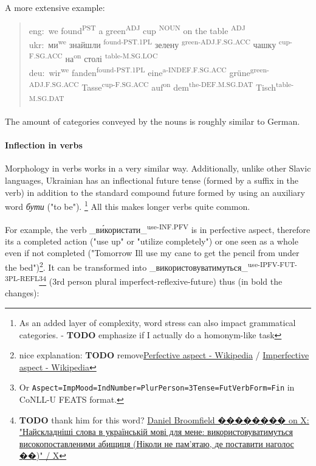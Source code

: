A more extensive example:

\begin{quote}
eng: we found\textsuperscript{PST} a green\textsuperscript{ADJ} cup \textsuperscript{NOUN} on
the table \textsuperscript{ADJ}\\
ukr: ми\textsuperscript{we} знайшли \textsuperscript{found-PST.1PL} зелену
\textsuperscript{green-ADJ.F.SG.ACC} чашку \textsuperscript{cup-F.SG.ACC}
на\textsuperscript{on} столі \textsuperscript{table-M.SG.LOC}\\
deu: wir\textsuperscript{we} fanden\textsuperscript{found-PST.1PL}
eine\textsuperscript{a-INDEF.F.SG.ACC} grüne\textsuperscript{green-ADJ.F.SG.ACC}
Tasse\textsuperscript{cup-F.SG.ACC} auf\textsuperscript{on}
dem\textsuperscript{the-DEF.M.SG.DAT} Tisch\textsuperscript{table-M.SG.DAT}
\end{quote}

The amount of categories conveyed by the nouns is roughly similar to
German.

\paragraph{Inflection in verbs}\label{inflection-in-verbs}

Morphology in verbs works in a very similar way. Additionally, unlike
other Slavic languages, Ukrainian has an inflectional future tense
(formed by a suffix in the verb) in addition to the standard compound
future formed by using an auxiliary word \emph{бути} ("to be").
\footnote{As an added layer of complexity, word stress can also impact
  grammatical categories. - \textbf{TODO} emphasize if I actually do a
  homonym-like task} All this makes longer verbs quite common.

For example, the verb \_ви́користати\_\textsuperscript{use-INF.PFV} is in
perfective aspect, therefore it\textquotesingle s a completed action
("use up" or "utilize completely") or one seen as a whole even if not
completed ("Tomorrow I\textquotesingle ll use my cane to get the pencil
from under the bed")\footnote{nice explanation: \textbf{TODO}
  remove\href{https://en.wikipedia.org/wiki/Perfective_aspect}{Perfective
  aspect - Wikipedia} /
  \href{https://en.wikipedia.org/wiki/Imperfective_aspect}{Imperfective
  aspect - Wikipedia}}. It can be transformed into
\_використовуватимуться\_\textsuperscript{use-IPFV-FUT-3PL-REFL}\footnote{Or
  \texttt{Aspect=Imp\textbar{}Mood=Ind\textbar{}Number=Plur\textbar{}Person=3\textbar{}Tense=Fut\textbar{}VerbForm=Fin}
  in CoNLL-U FEATS format.}\footnote{\textbf{TODO} thank him for this
  word?
  \href{https://twitter.com/Brooms1989/status/1611278169532768260}{Daniel
  Broomfield �������� on X: "Найскладніші слова в українській мові для мене:
  використовуватимуться високопоставленими абищиця (Ніколи не пам'ятаю,
  де поставити наголос ��)" / X}} (3rd person plural
imperfect-reflexive-future) thus (in bold the changes):

